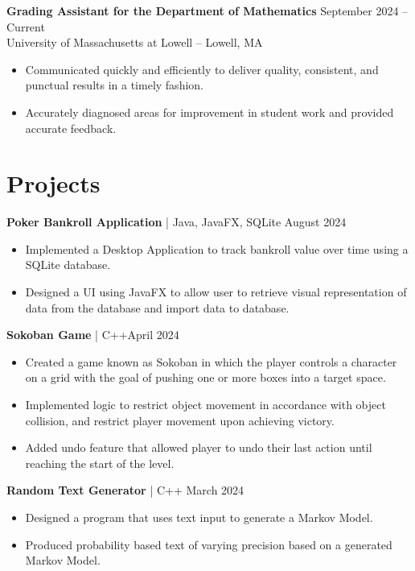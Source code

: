 \documentclass[11pt]{article}       %
\begin{document}
\textbf{Grading Assistant for the Department of Mathematics} \hfill September 2024 -- Current \\
University of Massachusetts at Lowell -- Lowell, MA \\
\vspace{-9pt}
\begin{itemize}
    \item Communicated quickly and efficiently to deliver quality, consistent, and punctual results in a timely fashion.
    \item Accurately diagnosed areas for improvement in student work and provided accurate feedback.
\end{itemize}
\vspace{-18.5pt}

\section*{Projects}

\textbf{Poker Bankroll Application} | Java, JavaFX, SQLite \hfill August 2024\\
\vspace{-9pt}
\begin{itemize}
    \item Implemented a Desktop Application to track bankroll value over time using a SQLite database.
    \item Designed a UI using JavaFX to allow user to retrieve visual representation of data from the database and import data to database.
\end{itemize}

\textbf{Sokoban Game} | C++\hfill April 2024\\
\vspace{-9pt}
\begin{itemize}
  \item Created a game known as Sokoban in which the player controls a character on a grid with the goal of pushing one or more boxes into a target space.
  \item Implemented logic to restrict object movement in accordance with object collision, and restrict player movement upon achieving victory.
  \item Added undo feature that allowed player to undo their last action until reaching the start of the level.
\end{itemize}

\textbf{Random Text Generator} | C++ \hfill March 2024 \\
\vspace{-9pt}
\begin{itemize}
  \item  Designed a program that uses text input to generate a Markov Model.
  \item Produced probability based text of varying precision based on a generated Markov Model.
\end{itemize}
\end{document}
